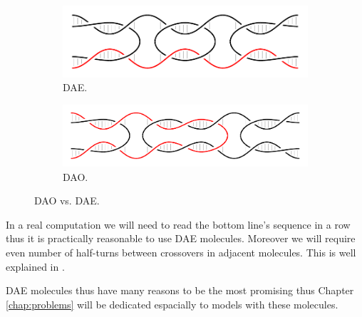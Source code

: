 		\begin{figure}[h]
		\begin{center}
			\begin{subfigure}[b]{0.433\textwidth} %
				\includegraphics[width=\textwidth]{./figures/dao-dae/dae.pdf}
				\caption{DAE.}
				\label{fig:dao}
			\end{subfigure}
			\begin{subfigure}[b]{0.5\textwidth} %
				\includegraphics[width=\textwidth]{./figures/dao-dae/dao.pdf}
				\caption{DAO.}
				\label{fig:dae}
			\end{subfigure}
			\caption{DAO vs. DAE.}
			\label{fig:dao-dae}
		\end{center}
		\end{figure}
		
		In a real computation we will need to read the bottom line's sequence in a row thus it is practically reasonable to use DAE molecules. Moreover we will require even number of half-turns between crossovers in adjacent molecules. This is well explained in \cite[p.37]{winfree_phd}.
		
		DAE molecules thus have many reasons to be the most promising %
		thus Chapter \ref{chap:problems} will be dedicated espacially to models with these molecules.